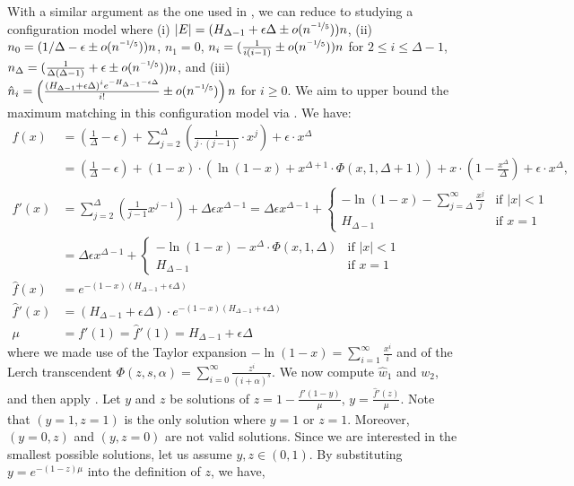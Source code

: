 \documentclass[11pt]{article}
\begin{document}
\begin{appendixproof}
With a similar argument as the one used in , we can reduce to studying a configuration model where (i) $|E|=(H_{\Delta-1} + \epsilon\Delta \pm o(n^{\nicefrac{-1}5}))n$, (ii) $n_0=(1/\Delta-\epsilon \pm o(n^{\nicefrac{-1}5}))n$, $n_1=0$, $n_i=(\frac{1}{i(i-1)} \pm o(n^{\nicefrac{-1}5}))n$ for $2\leq i\leq \Delta-1$, $n_{\Delta}=(\frac{1}{\Delta(\Delta-1)}+\epsilon \pm o(n^{\nicefrac{-1}{5}}))n$, and (iii) $\hat{n}_i=\left(\frac{(H_{\Delta-1} + \epsilon\Delta)^i e^{-H_{\Delta-1} - \epsilon\Delta}}{i!} \pm o(n^{\nicefrac{-1}5})\right)n$ for $i\ge 0$. We aim to upper bound the maximum matching in this configuration model via . We have:
\begin{align*}
f(x) &=  \left(\frac{1}{\Delta} - \epsilon\right) +\sum_{j = 2}^{\Delta} \left(\frac1{j\cdot(j-1)} \cdot x^j\right) + \epsilon \cdot x^\Delta\\
&=\left(\frac1{\Delta}-\epsilon\right)+\left(1-x\right)\cdot \left(\ln(1-x)+x^{\Delta+1}\cdot\Phi(x,1,\Delta+1)\right) + x \cdot \left(1- \frac{x^{\Delta}}{\Delta}\right) + \epsilon \cdot x^{\Delta},\\
f'(x)&= \sum_{j = 2}^{\Delta} \left(\frac1{j-1}  x^{j-1}\right) + \Delta \epsilon  x^{\Delta-1}= \Delta \epsilon  x^{\Delta-1}+\left\{\begin{array}{ll}
-\ln(1-x)  -  \sum_{j=\Delta}^{\infty} \frac{x^j}j & \text{if } |x| < 1\\
H_{\Delta-1} & \text{if } x = 1\end{array}\right.\\
&=\Delta \epsilon  x^{\Delta-1}+\left\{\begin{array}{ll}
-\ln(1-x)  - x^{\Delta}\cdot \Phi(x,1,\Delta) & \text{if } |x| < 1\\
H_{\Delta-1} & \text{if } x = 1\end{array}\right. \\
\hat{f}(x) & = e^{-(1-x)(H_{\Delta-1} + \epsilon\Delta)}\\
\hat{f}'(x) & = (H_{\Delta-1}+\epsilon\Delta) \cdot e^{-(1-x)(H_{\Delta-1} + \epsilon\Delta)}\\
\mu & = f'(1)=\hat{f}'(1) = H_{\Delta-1} + \epsilon\Delta
\end{align*}where we made use of the Taylor expansion $-\ln(1-x)=\sum_{i=1}^\infty \frac{x^i}{i}$ and of the Lerch transcendent $\Phi(z, s, \alpha)=\sum_{i=0}^\infty \frac{z^i}{(i+\alpha)^s}$. We now compute $\hat{w}_1$ and $w_2$, and then apply . Let $y$ and $z$ be solutions of $z=1 - \frac{f'(1-y)}{\mu}$, $y=\frac{\hat{f}'(z)}{\mu}$. Note that $(y=1,z=1)$ is the only solution where $y=1$ or $z=1$. Moreover, $(y=0, z)$ and $(y, z=0)$ are not valid solutions. Since we are interested in the smallest possible solutions, let us assume $y,z \in (0,1)$. By substituting $y=e^{-(1-z)\mu}$ into the definition of $z$, we have,

\end{appendixproof}
\end{document}
